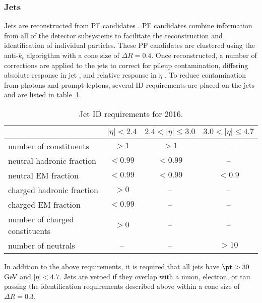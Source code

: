 \FloatBarrier
\subsubsection{Jets}
\label{sec:jets}

Jets are reconstructed from PF candidates \cite{ref:pf}. PF
candidates combine information from all of the detector subsystems to
facilitate the reconstruction and identification of individual
particles.  These PF candidates are clustered using the anti-$k_{t}$
algorigthm \cite{Cacciari:2008gp} with a cone size of $\Delta R = 0.4$.
Once reconstructed, a number of corrections are applied to the jets to
correct for pileup contamination, differing absolute response in jet
\pt, and relative response in $\eta$ \cite{ref:jetscale}.  To reduce
contamination from photons and prompt leptons, several ID requirements
are placed on the jets and are listed in table~\ref{tab:jet_id_2016}.

\begin{table}[h]
    \begin{center}
    \caption{Jet ID requirements for 2016. 
    \label{tab:jet_id_2016}}
    \begin{tabular}{l|ccc}
    \hline
                                   & $|\eta| < 2.4$ & $2.4 < |\eta| \leq 3.0$ & $3.0 < |\eta| \leq 4.7$ \\
    \hline                                                                   
    number of constituents         & $> 1$          & $> 1$                  & -- \\
    neutral hadronic fraction      & $< 0.99$       & $< 0.99$               & -- \\
    neutral EM fraction            & $< 0.99$       & $< 0.99$               & $<0.9$ \\
    charged hadronic fraction      & $> 0$          & --                     & -- \\
    charged EM fraction            & $< 0.99$       & --                     & -- \\
    number of charged constituents & $> 0$          & --                     & -- \\
    number of neutrals             & --             & --                     & $>10$                   \\
    \hline
    \end{tabular}
    \end{center}
\end{table}

\noindent
In addition to the above requirements, it is required that all jets have
$\pt > 30$ GeV and $\left|\eta\right| < 4.7$.  Jets are vetoed if they
overlap with a muon, electron, or tau passing the identification
requirements described above within a cone size of $\Delta R = 0.3$. 

